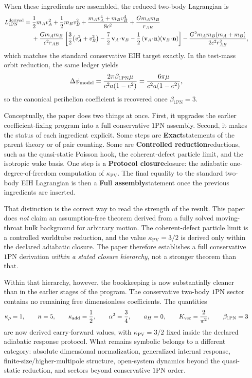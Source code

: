 \documentclass[11pt]{article}
\newcommand{\vct}{\mathbf v}
\newcommand{\nvec}{\mathbf n}
\newcommand{\kadd}{\kappa_{\mathrm{add}}}
\newcommand{\kPV}{\kappa_{\mathrm{PV}}}
\newcommand{\krho}{\kappa_{\rho}}
\newcommand{\betaPN}{\beta_{\mathrm{1PN}}}
\newcommand{\Exact}{\textbf{Exact}}
\newcommand{\Controlled}{\textbf{Controlled reduction}}
\newcommand{\Protocol}{\textbf{Protocol closure}}
\newcommand{\FullMatch}{\textbf{Full assembly}}
\begin{document}
When these ingredients are assembled, the reduced two-body Lagrangian is
\begin{align}
L_{\rm 1PN}^{\rm derived}
={}&
\frac12 m_A v_A^2 + \frac12 m_B v_B^2
+ \frac{m_A v_A^4 + m_B v_B^4}{8c^2}
+ \frac{Gm_A m_B}{r_{AB}}
\nonumber\\
&
+ \frac{Gm_A m_B}{c^2 r_{AB}}
\left[
\frac32\bigl(v_A^2+v_B^2\bigr)
-\frac72\,\vct_A\!\cdot\!\vct_B
-\frac12\,(\vct_A\!\cdot\!\nvec)(\vct_B\!\cdot\!\nvec)
\right]
- \frac{G^2m_A m_B(m_A+m_B)}{2c^2 r_{AB}^2},
\label{eq:conclusion-final-eih}
\end{align}
which matches the standard conservative EIH target exactly. In the test-mass orbit
reduction, the same ledger yields
\begin{equation}
\Delta\phi_{\rm model}
=
\frac{2\pi\betaPN\mu}{c^2 a(1-e^2)}
=
\frac{6\pi\mu}{c^2 a(1-e^2)},
\label{eq:conclusion-perihelion}
\end{equation}
so the canonical perihelion coefficient is recovered once \(\betaPN=3\).

Conceptually, the paper does two things at once. First, it upgrades the earlier
coefficient-fixing program into a full conservative \(1\)PN assembly. Second, it makes the
status of each ingredient explicit. Some steps are \Exact statements of the parent theory
or of pair counting. Some are \Controlled reductions, such as the quasi-static Poisson
hook, the coherent-defect particle limit, and the isotropic wake basis. One step is a
\Protocol closure: the adiabatic one-degree-of-freedom computation of \(\kPV\). The final
equality to the standard two-body EIH Lagrangian is then a \FullMatch statement once the
previous ingredients are inserted.

That distinction is the correct way to read the strength of the result. This paper does
\emph{not} claim an assumption-free theorem derived from a fully solved moving-throat bulk
background for arbitrary motion. The coherent-defect particle limit is a controlled
worldtube reduction, and the value \(\kPV=3/2\) is derived only within the declared
adiabatic closure. The paper therefore establishes a full conservative \(1\)PN derivation
\emph{within a stated closure hierarchy}, not a stronger theorem than that.

Within that hierarchy, however, the bookkeeping is now substantially cleaner than in the
earlier stages of the program. The conservative two-body \(1\)PN sector contains no
remaining free dimensionless coefficients. The quantities
\begin{equation}
\krho=1,
\qquad
n=5,
\qquad
\kadd=\frac12,
\qquad
\alpha^2=\frac34,
\qquad
a_H=0,
\qquad
K_{\rm vec}=\frac{2}{\pi^2},
\qquad
\betaPN=3
\label{eq:conclusion-fixed-ledger}
\end{equation}
are now derived carry-forward values, with \(\kPV=3/2\) fixed inside the declared
adiabatic response protocol. What remains symbolic belongs to a different category:
absolute dimensional normalization, generalized internal response,
finite-size/higher-multipole structure, open-system dynamics beyond the quasi-static
reduction, and sectors beyond conservative \(1\)PN order.
\end{document}
